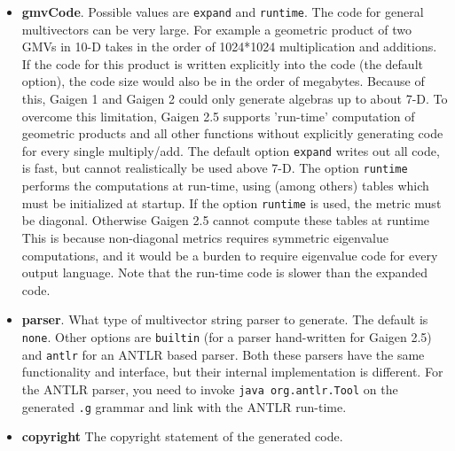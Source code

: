 \documentclass[10pt, a4paper]{article}
\begin{document}
\begin{itemize}
\item {\bf gmvCode}. Possible values are {\tt expand} and {\tt runtime}. The code for general multivectors can be very large. For example a geometric product of two GMVs in 10-D 
      takes in the order of 1024*1024 multiplication and additions. If the code for this product is written explicitly into the code (the default option),
      the code size would also be in the order of megabytes. Because of this, Gaigen 1 and Gaigen 2 could only generate algebras up to about 7-D.
      To overcome this limitation, Gaigen 2.5 supports 'run-time' computation of geometric products and all other functions without explicitly generating
      code for every single multiply/add. The default option {\tt expand} writes out all code, is fast, but cannot realistically be used above 7-D. 
      The option {\tt runtime} performs the computations at run-time, using (among others) tables which must be initialized at startup. 
      If the option {\tt runtime} is used, the metric must be diagonal. Otherwise Gaigen 2.5 cannot compute these tables at runtime
      This is because non-diagonal metrics requires symmetric eigenvalue computations, and 
      it would be a burden to require eigenvalue code for every output language. Note that the run-time code is slower than the expanded code.
      
\item {\bf parser}. What type of multivector string parser to generate. The default is {\tt none}. Other options are
       {\tt builtin} (for a parser hand-written for Gaigen 2.5) and {\tt antlr} for an ANTLR based parser. Both these parsers have the
       same functionality and interface, but their internal implementation is different. For the ANTLR parser, you need to
       invoke {\tt java org.antlr.Tool} on the generated {\tt .g} grammar and link with the ANTLR run-time.
       
\item {\bf copyright} The copyright statement of the generated code.
\end{itemize}
 
\end{document}
